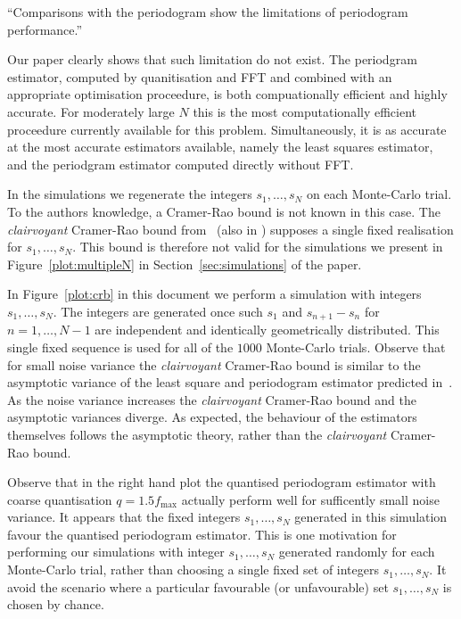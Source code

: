 \documentclass[a4paper,10pt]{article}
\begin{document}
\begin{enumerate}
``Comparisons with the periodogram show the limitations of periodogram performance.''

Our paper clearly shows that such limitation do not exist.  The periodgram estimator, computed by quanitisation and FFT and combined with an appropriate optimisation proceedure, is both compuationally efficient and highly accurate.  For moderately large $N$ this is the most computationally efficient proceedure currently available for this problem.  Simultaneously, it is as accurate at the most accurate estimators available, namely the least squares estimator, and the periodgram estimator computed directly without FFT.

In the simulations we regenerate the integers $s_1,\dots,s_N$ on each Monte-Carlo trial. To the authors knowledge, a Cramer-Rao bound is not known in this case.   The \emph{clairvoyant} Cramer-Rao bound from~\cite{Sidiropoulos2005} (also in \cite{726812,Clarkson2007}) supposes a single fixed realisation for $s_1,\dots,s_N$.  This bound is therefore not valid for the simulations we present in Figure~\ref{plot:multipleN} in Section~\ref{sec:simulations} of the paper.  

In Figure~\ref{plot:crb} in this document we perform a simulation with integers $s_1,\dots,s_N$. The integers are generated once such $s_1$ and $s_{n+1} - s_n$ for $n=1,\dots,N-1$ are independent and identically geometrically distributed.  This single fixed sequence is used for all of the $1000$ Monte-Carlo trials.  Observe that for small noise variance the \emph{clairvoyant} Cramer-Rao bound is similar to the asymptotic variance of the least square and periodogram estimator predicted in~\cite{Quinn_sparse_noisy_SSP_2012,Quinn20013asilomar_period_est}.  As the noise variance increases the \emph{clairvoyant} Cramer-Rao bound and the asymptotic variances diverge.  As expected, the behaviour of the estimators themselves follows the asymptotic theory, rather than the \emph{clairvoyant} Cramer-Rao bound.

Observe that in the right hand plot the quantised periodogram estimator with coarse quantisation $q = 1.5 f_{\text{max}}$ actually perform well for sufficently small noise variance.  It appears that the fixed integers $s_1,\dots,s_N$ generated in this simulation favour the quantised periodogram estimator.  This is one motivation for performing our simulations with integer $s_1,\dots,s_N$ generated randomly for each Monte-Carlo trial, rather than choosing a single fixed set of integers $s_1,\dots,s_N$.  It avoid the scenario where a particular favourable (or unfavourable) set $s_1,\dots,s_N$ is chosen by chance.


\end{enumerate}
\end{document}
